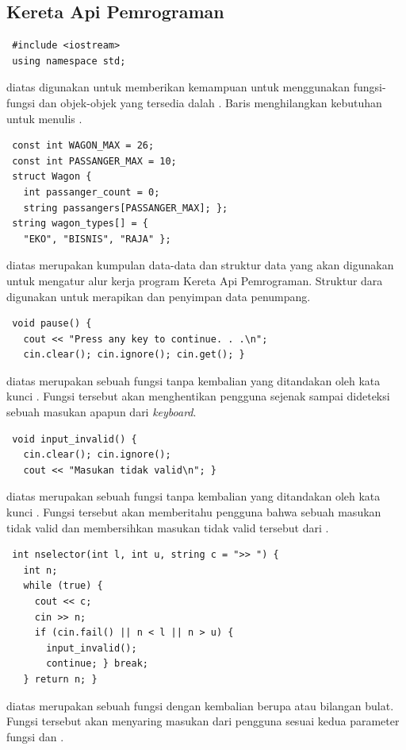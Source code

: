 \documentclass[../main.tex]{subfiles}
\begin{document}
    \subsection{Kereta Api Pemrograman}

\begin{lstlisting}
 #include <iostream>
 using namespace std;
\end{lstlisting}
    \ilz{}{\Script} diatas digunakan untuk memberikan kemampuan untuk menggunakan fungsi-fungsi dan objek-objek yang tersedia dalah {\header} {\file} . Baris  menghilangkan kebutuhan untuk menulis .

\begin{lstlisting}
 const int WAGON_MAX = 26;
 const int PASSANGER_MAX = 10;
 struct Wagon {
   int passanger_count = 0;
   string passangers[PASSANGER_MAX]; };
 string wagon_types[] = {
   "EKO", "BISNIS", "RAJA" };
\end{lstlisting}
    \ilz{}{\Script} diatas merupakan kumpulan data-data dan struktur data yang akan digunakan untuk mengatur alur kerja program Kereta Api Pemrograman. Struktur dara  digunakan untuk merapikan dan penyimpan data penumpang.

\begin{lstlisting}
 void pause() {
   cout << "Press any key to continue. . .\n";
   cin.clear(); cin.ignore(); cin.get(); }
\end{lstlisting}
    \ilz{}{\Script} diatas merupakan sebuah fungsi tanpa kembalian yang ditandakan oleh kata kunci . Fungsi tersebut akan menghentikan pengguna sejenak sampai dideteksi sebuah masukan apapun dari \textit{keyboard}.

\begin{lstlisting}
 void input_invalid() {
   cin.clear(); cin.ignore();
   cout << "Masukan tidak valid\n"; }
\end{lstlisting}
    \ilz{}{\Script} diatas merupakan sebuah fungsi tanpa kembalian yang ditandakan oleh kata kunci . Fungsi tersebut akan memberitahu pengguna bahwa sebuah masukan tidak valid dan membersihkan masukan tidak valid tersebut dari {\ioi} {\stream}.

\begin{lstlisting}
 int nselector(int l, int u, string c = ">> ") {
   int n;
   while (true) {
     cout << c;
     cin >> n;
     if (cin.fail() || n < l || n > u) {
       input_invalid();
       continue; } break;
   } return n; }
\end{lstlisting}
    \ilz{}{\Script} diatas merupakan sebuah fungsi dengan kembalian berupa  atau bilangan bulat. Fungsi tersebut akan menyaring masukan dari pengguna sesuai kedua parameter fungsi  dan .
\end{document}
